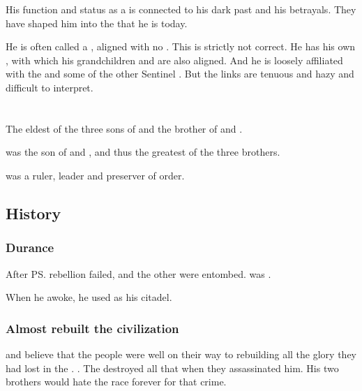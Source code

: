 His function and status as a \vertex{} is connected to his dark past and his betrayals. 
They have shaped him into the \vertex{} that he is today. 

He is often called a , aligned with no \matrix. 
This is strictly not correct. 
He has his own \matrix, with which his grandchildren and \Criseis{} are also aligned. 
And he is loosely affiliated with the  and some of the other Sentinel \matrices. 
But the links are tenuous and hazy and difficult to interpret. 















\section{\RaemythNexagglachel}
\index{\RaemythNexagglachel}
\index{\Nexagglachel}
The eldest of the three sons of \Tiamat and the brother of \Ishnaruchaefir{} and \Secherdamon.

\Nexagglachel was the son of \Tiamat and \Sethicus, and thus the greatest of the three brothers.

\Nexagglachel{} was a ruler, leader and preserver of order. 









\subsection{History}





\subsubsection{Durance}
After \ps{\Sethicus} rebellion failed, \Nexagglachel and the other \dragons were entombed. 
\Nexagglachel was . 

When he awoke, he used \Nithdornazsh as his citadel. 





\subsubsection{Almost rebuilt the \draconian{} civilization}
\Secherdamon{} and \Ishnaruchaefir{} believe that the \draconian{} people were well on their way to rebuilding all the glory they had lost in the \firstbanewar. 
. 
The \resphain{} destroyed all that when they assassinated him. 
His two brothers would hate the \resphan race forever for that crime. 





